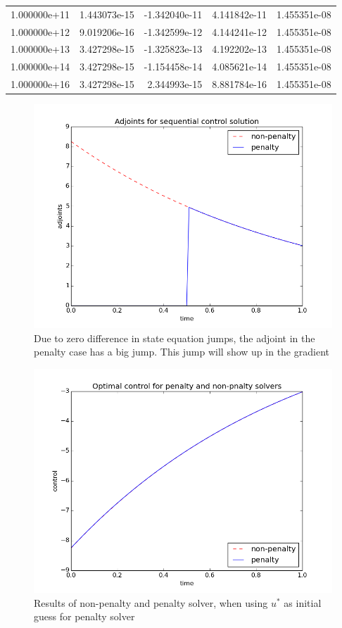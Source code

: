 \documentclass[11pt,a4paper]{report}
\begin{document}
\begin{tabular}{lrrrr}
1.000000e+11 &              1.443073e-15 &                   -1.342040e-11 &  4.141842e-11 &  1.455351e-08 \\
1.000000e+12 &              9.019206e-16 &                   -1.342599e-12 &  4.144241e-12 &  1.455351e-08 \\
1.000000e+13 &              3.427298e-15 &                   -1.325823e-13 &  4.192202e-13 &  1.455351e-08 \\
1.000000e+14 &              3.427298e-15 &                   -1.154458e-14 &  4.085621e-14 &  1.455351e-08 \\
1.000000e+16 &              3.427298e-15 &                    2.344993e-15 &  8.881784e-16 &  1.455351e-08 \\
\bottomrule
\end{tabular}
\begin{figure}
  \includegraphics[width=\linewidth]{adjoint.png}
  \caption{Due to zero difference in state equation jumps, the adjoint in the penalty case has a big jump. This jump will show up in the gradient}
  \label{Fig 1}
\end{figure}
\begin{figure}
  \includegraphics[width=\linewidth]{control.png}
  \caption{Results of non-penalty and penalty solver, when using $u^*$ as initial guess for penalty solver}
  \label{Fig 2}
\end{figure}
\end{document}
